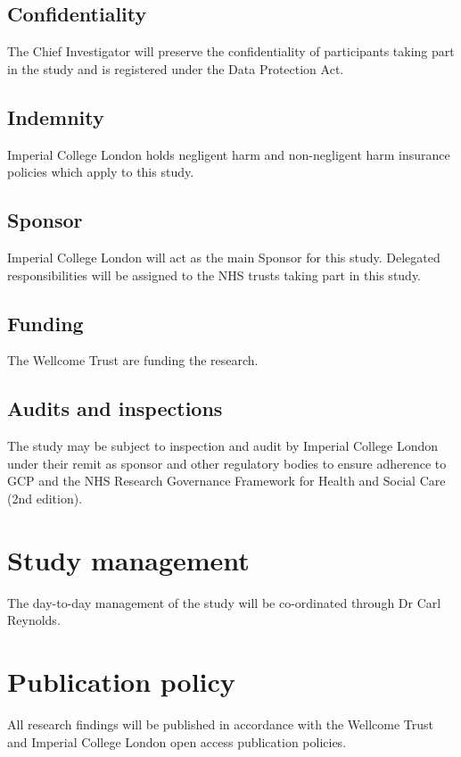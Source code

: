 \documentclass[a4paper,10pt]{article}
\begin{document}
\subsection{Confidentiality}
The Chief Investigator will preserve the confidentiality of participants taking part in the study and is registered under the Data Protection Act.

\subsection{Indemnity}
Imperial College London holds negligent harm and non-negligent harm insurance policies which apply to this study.

\subsection{Sponsor}
Imperial College London will act as the main Sponsor for this study. Delegated responsibilities will be assigned to the NHS trusts taking part in this study.  


\subsection{Funding}
The Wellcome Trust are funding the research.

\subsection{Audits and inspections}
The study may be subject to inspection and audit by Imperial College London under their remit as sponsor and other regulatory bodies to ensure adherence to GCP and the NHS Research Governance Framework for Health and Social Care (2nd edition). 

\section{Study management}
The day-to-day management of the study will be co-ordinated through Dr Carl Reynolds.

\section{Publication policy}
All research findings will be published in accordance with the Wellcome Trust and Imperial College London open access publication policies.

\newpage
\end{document}
